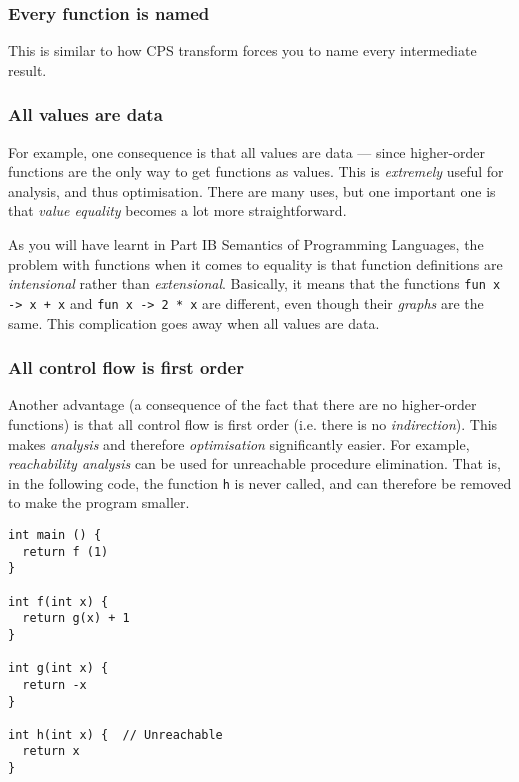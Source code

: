 \subsubsection{Every function is named}
This is similar to how CPS transform forces you to name every intermediate result. 

\subsubsection{All values are data}
For example, one consequence is that all values are data --- since higher-order functions are the only way to get functions as values. This is \emph{extremely} useful for analysis, and thus optimisation. There are many uses, but one important one is that \emph{value equality} becomes a lot more straightforward. 

As you will have learnt in {\sffamily Part IB Semantics of Programming Languages}, the problem with functions when it comes to equality is that function definitions are \emph{intensional} rather than \emph{extensional}. Basically, it means that the functions \texttt{fun x -> x + x} and \texttt{fun x -> 2 * x} are different, even though their \emph{graphs} are the same. This complication goes away when all values are data.

\subsubsection{All control flow is first order}
Another advantage (a consequence of the fact that there are no higher-order functions) is that all control flow is first order (i.e. there is no \emph{indirection}). This makes \emph{analysis} and therefore \emph{optimisation} significantly easier. For example, \emph{reachability analysis} can be used for unreachable procedure elimination. That is, in the following code, the function \texttt{h} is never called, and can therefore be removed to make the program smaller.

\begin{code}
\label{code:unreachable-c}
\begin{verbatim}
int main () {
  return f (1)
}

int f(int x) {
  return g(x) + 1
}

int g(int x) {
  return -x
}

int h(int x) {  // Unreachable
  return x
}
\end{verbatim}
\end{code}

